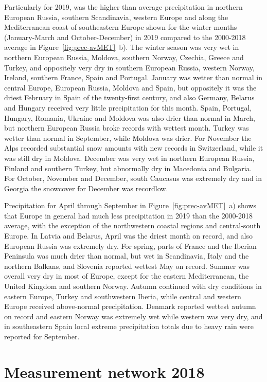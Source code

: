 Particularly for 2019, was the higher than average precipitation in northern European Russia, southern Scandinavia, western Europe and along the Mediterranean coast of southeastern Europe shown for the winter months (January-March and October-December) in 2019 compared to the 2000-2018 average in Figure~\ref{fig:prec-avMET}~b). The winter season was very wet in northern European Russia, Moldova, southern Norway, Czechia, Greece and Turkey, and oppositely very dry in southern European Russia, western Norway, Ireland, southern France, Spain and Portugal. January was wetter than normal in central Europe, European Russia, Moldova and Spain, but oppositely it was the driest February in Spain of the twenty-first century, and also Germany, Belarus and Hungary received very little precipitation for this month. Spain, Portugal, Hungary, Romania, Ukraine and Moldova was also drier than normal in March, but northern European Russia broke records with wettest month. Turkey was wetter than normal in September, while Moldova was drier. For November the Alps recorded substantial snow amounts with new records in Switzerland, while it was still dry in Moldova. December was very wet in northern European Russia, Finland and southern Turkey, but abnormally dry in Macedonia and Bulgaria. For October, November and December, south Caucasus was extremely dry and in Georgia the snowcover for December was recordlow.

Precipitation for April through September in Figure~\ref{fig:prec-avMET}~a) shows that Europe in general had much less precipitation in 2019 than the 2000-2018 average, with the exception of the northwestern coastal regions and central-south Europe. In Latvia and Belarus, April was the driest month on record, and also European Russia was extremely dry. For spring, parts of France and the Iberian Peninsula was much drier than normal, but wet in Scandinavia, Italy and the northern Balkans, and Slovenia reported wettest May on record. Summer was overall very dry in most of Europe, except for the eastern Mediterranean, the United Kingdom and southern Norway. Autumn continued with dry conditions in eastern Europe, Turkey and southwestern Iberia, while central and western Europe received above-normal precipitation. Denmark reported wettest autumn on record and eastern Norway was extremely wet while western was very dry, and in southeastern Spain local extreme precipitation totals due to heavy rain were reported for September.

\section{Measurement network 2018} 
\label{Obs_2018}

